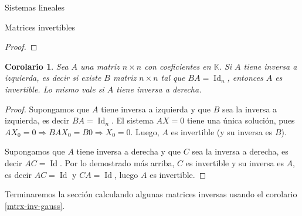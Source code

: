 \documentclass[a4paper,12pt,twoside,spanish,reqno]{amsbook}
\numberwithin{equation}{section}
\newtheorem{corolario}[teorema]{Corolario}
\theoremstyle{definition}
\theoremstyle{remark}
\newcommand{\Id}{\operatorname{Id}}
\newcommand{\K}{\mathbb K}
\begin{document}
\begin{chapter}{Sistemas lineales}
\begin{section}{Matrices invertibles}
\begin{proof}
            \end{proof}
            
            \begin{corolario}
                Sea $A$ una matriz $n \times n$ con coeficientes  en $\K$. Si $A$ tiene inversa a izquierda,  es decir si existe $B$ matriz $n \times n$ tal que $BA=\Id_n$,   entonces $A$ es invertible.  Lo mismo vale si $A$ tiene inversa a derecha. 
            \end{corolario}	
            \begin{proof}
                Supongamos que  $A$ tiene inversa a izquierda y  que $B$ sea la inversa a izquierda,  es decir $BA=\Id_n$. El sistema $AX=0$ tiene una única solución, pues $AX_0=0 \Rightarrow BAX_0=B0 \Rightarrow X_0=0$. Luego, $A$  es invertible (y su inversa es $B$). 
                
                Supongamos que  $A$ tiene inversa a derecha y  que $C$ sea la inversa a derecha, es decir $AC=\Id$. Por lo demostrado más arriba, $C$ es invertible y su inversa es $A$, es decir $AC=\Id$ y $CA=\Id$, luego $A$  es invertible. 
            \end{proof}	
            
            
            
            Terminaremos la  sección calculando algunas matrices inversas usando el corolario  \ref{mtrx-inv-gauss}. 
            

\end{section}
\end{chapter}
\end{document}
